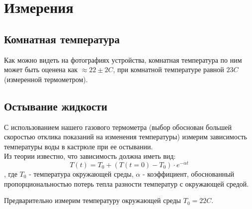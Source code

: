 \newpage

\section{Измерения}

\subsection{Комнатная температура}

Как можно видеть на фотографиях устройства, комнатная температура по ним может быть оценена как $\approx 22 \pm 2 C$, при комнатной температуре равной $23C$ (измеренной термометром).

\subsection{Остывание жидкости}

С использованием нашего газового термометра (выбор обоснован большей скоростью отклика показаний на изменения температуры) измерим зависимость температуры воды в кастрюле при ее остывании.\\

Из теории известно, что зависимость должна иметь вид:
\[T(t) = T_0 + (T(t = 0) - T_0)\cdot e^{-\alpha t}\]
, где $T_0$ - температура окружающей среды, $\alpha$ - коэффициент, обоснованный пропорциональностью потерь тепла разности температур с окружающей средой.

Предварительно измерим температуру окружающей среды $T_0 = 22C$.


